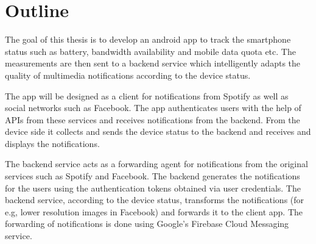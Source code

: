 \section{Outline}

The goal of this thesis is to develop an android app to track the smartphone status such as battery, bandwidth availability and mobile data quota etc. The measurements are then sent to a backend service which intelligently adapts the quality of multimedia notifications according to the device status.

The app will be designed as a client for notifications from Spotify as well as social networks such as Facebook. The app authenticates users with the help of APIs from these services and receives notifications from the backend. From the device side it collects and sends the device status to the backend and receives and displays the notifications.

The backend service acts as a forwarding agent for notifications from the original services such as Spotify and Facebook. The backend generates the notifications for the users using the authentication tokens obtained via user credentials. The backend service, according to the device status, transforms the notifications (for e.g, lower resolution images in Facebook) and forwards it to the client app. The forwarding of notifications is done using Google's Firebase Cloud Messaging service.